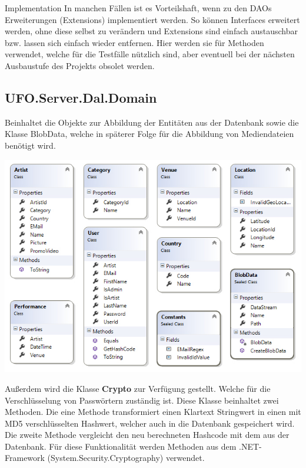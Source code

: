 \begin{section}{Implementation}
In manchen Fällen ist es Vorteilshaft, wenn zu den DAOs Erweiterungen (Extensions) implementiert werden.
So können Interfaces erweitert werden, ohne diese selbst zu verändern und Extensions sind einfach austauschbar bzw. lassen sich einfach wieder entfernen. Hier werden sie für Methoden verwendet, welche für die Testfälle nützlich sind, aber eventuell bei der nächsten Ausbaustufe des Projekts obsolet werden.


\subsection{UFO.Server.Dal.Domain}
Beinhaltet die Objekte zur Abbildung der Entitäten aus der Datenbank sowie die Klasse BlobData, welche in späterer Folge für die Abbildung von Mediendateien benötigt wird.

\nPar

\includegraphics[angle=0, scale=0.45]{./img/ufoDomainClasses.jpg}
\FloatBarrier

\nPar

Außerdem wird die Klasse \textbf{Crypto} zur Verfügung gestellt. Welche für die Verschlüsselung von Passwörtern zuständig ist.
Diese Klasse beinhaltet zwei Methoden. Die eine Methode transformiert einen Klartext Stringwert in einen mit MD5 verschlüsselten Hashwert, welcher auch in die Datenbank gespeichert wird.
Die zweite Methode vergleicht den neu berechneten Hashcode mit dem aus der Datenbank.
Für diese Funktionalität werden Methoden aus dem .NET-Framework (System.Security.Cryptography) verwendet.



\end{section}